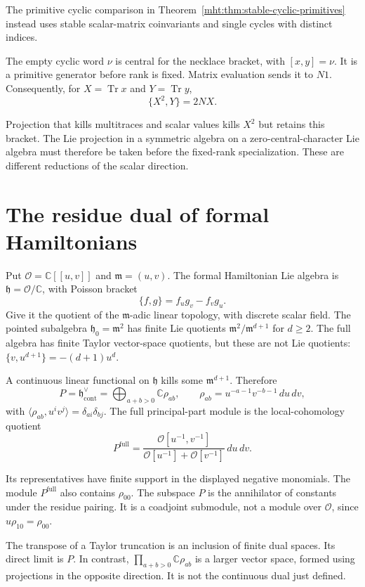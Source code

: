 The primitive cyclic comparison in
Theorem~\ref{mht:thm:stable-cyclic-primitives} instead uses stable
scalar-matrix coinvariants and single cycles with distinct indices.

The empty cyclic word $\nu$ is central for the necklace bracket,
with $[x,y]=\nu$. It is a primitive generator before rank is fixed.
Matrix evaluation sends it to $N1$. Consequently, for
$X=\operatorname{Tr}x$ and $Y=\operatorname{Tr}y$,
\[
 \{X^2,Y\}=2NX.
\]

Projection that kills multitraces and scalar values kills $X^2$
but retains this bracket. The Lie projection in a symmetric
algebra on a zero-central-character Lie algebra must therefore be
taken before the fixed-rank specialization. These are different
reductions of the scalar direction.

\section{The residue dual of formal Hamiltonians}

Put $\mathcal O=\mathbb C[[u,v]]$ and
$\mathfrak m=(u,v)$. The formal Hamiltonian Lie algebra is
$\mathfrak h=\mathcal O/\mathbb C$, with Poisson bracket
\[
 \{f,g\}=f_u g_v-f_v g_u.
\]
Give it the quotient of the $\mathfrak m$-adic linear topology,
with discrete scalar field. The pointed subalgebra
$\mathfrak h_0=\mathfrak m^2$ has finite Lie quotients
$\mathfrak m^2/\mathfrak m^{d+1}$ for $d\geq2$.
The full algebra has finite Taylor vector-space quotients, but
these are not Lie quotients: $\{v,u^{d+1}\}=-(d+1)u^d$.

A continuous linear functional on $\mathfrak h$ kills some
$\mathfrak m^{d+1}$. Therefore
\[
 P=\mathfrak h^\vee_{\mathrm{cont}}
    =\bigoplus_{a+b>0}\mathbb C\rho_{ab},\qquad
 \rho_{ab}=u^{-a-1}v^{-b-1}\,du\,dv,
\]
with $\langle\rho_{ab},u^iv^j\rangle=\delta_{ai}\delta_{bj}$.
The full principal-part module is the local-cohomology quotient
\[
 P^{\mathrm{full}}=
 \frac{\mathcal O[u^{-1},v^{-1}]}
      {\mathcal O[u^{-1}]+\mathcal O[v^{-1}]}\,du\,dv.
\]

Its representatives have finite support in the displayed negative
monomials. The module $P^{\mathrm{full}}$ also contains
$\rho_{00}$. The subspace $P$ is the annihilator of constants
under the residue pairing. It is a coadjoint submodule, not a module over
$\mathcal O$, since $u\rho_{10}=\rho_{00}$.

The transpose of a Taylor truncation is an inclusion of finite
dual spaces. Its direct limit is $P$. In contrast,
$\prod_{a+b>0}\mathbb C\rho_{ab}$ is a larger vector space,
formed using projections in the opposite direction. It is not
the continuous dual just defined.

